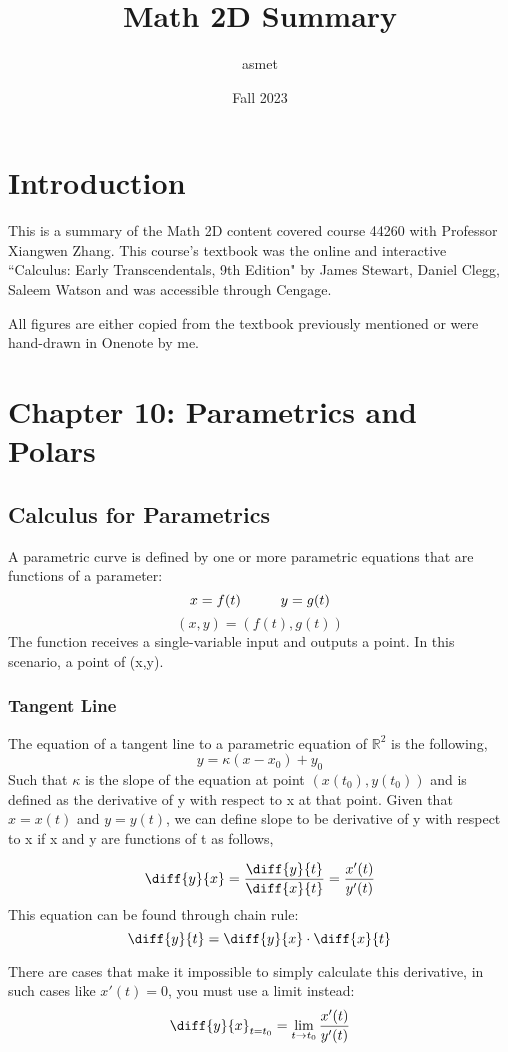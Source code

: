 \documentclass{article}
\title{Math 2D Summary}
\author{asmet}
\date{Fall 2023}
\begin{document}
\maketitle

\section{Introduction}
This is a summary of the Math 2D content covered course 44260 with Professor Xiangwen Zhang. This course's textbook was the online and interactive ``Calculus: Early Transcendentals, 9th Edition" by James Stewart, Daniel Clegg, Saleem Watson and was accessible through Cengage.

All figures are either copied from the textbook previously mentioned or were hand-drawn in Onenote by me. 




\section{Chapter 10: Parametrics and Polars}

\subsection{Calculus for Parametrics}
A parametric curve is defined by one or more parametric equations that are functions of a parameter:
$$x = f(t) \hspace{1 cm} y = g(t)$$
$$(x,y) = (f(t),g(t))$$
The function receives a single-variable input and outputs a point. In this scenario, a point of (x,y). 

\subsubsection{Tangent Line}
The equation of a tangent line to a parametric equation of $\mathbb{R}^2$ is the following, 
$$y=\kappa(x-x_0)+y_0$$
Such that $\kappa$ is the slope of the equation at point $(x(t_0),y(t_0))$ and is defined as the derivative of y with respect to x at that point. Given that $x = x(t)$ and $y = y(t)$, we can define slope to be derivative of y with respect to x if x and y are functions of t as follows,

$$\diff{y}{x} = \frac{\diff{y}{t}}{\diff{x}{t}} =\frac{x'(t)}{y'(t)}$$
This equation can be found through chain rule:
$$\diff{y}{t}=\diff{y}{x}\cdot\diff{x}{t}$$

There are cases that make it impossible to simply calculate this derivative, in such cases like $x'(t) = 0$, you must use a limit instead: 
$$\diff{y}{x}_{t=t_0} = \lim_{t\to t_0}{\frac{x'(t)}{y'(t)}}$$
\end{document}
